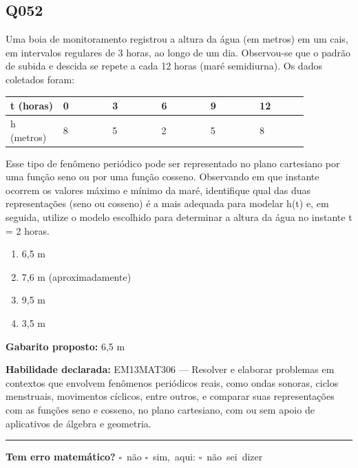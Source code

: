 \documentclass[11pt,a4paper]{article}
\begin{document}
\begin{samepage}
\subsection*{Q052}
Uma boia de monitoramento registrou a altura da água (em metros) em um cais, em intervalos regulares de 3 horas, ao longo de um dia. Observou-se que o padrão de subida e descida se repete a cada 12 horas (maré semidiurna). Os dados coletados foram:

\begin{center}
\begin{tabular}{|p{0.143\linewidth}|p{0.143\linewidth}|p{0.143\linewidth}|p{0.143\linewidth}|p{0.143\linewidth}|p{0.143\linewidth}|}
\hline
\textbf{t (horas)} & \textbf{0} & \textbf{3} & \textbf{6} & \textbf{9} & \textbf{12} \\
\hline
h (metros) & 8 & 5 & 2 & 5 & 8 \\
\hline
\end{tabular}
\end{center}

Esse tipo de fenômeno periódico pode ser representado no plano cartesiano por uma função seno ou por uma função cosseno. Observando em que instante ocorrem os valores máximo e mínimo da maré, identifique qual das duas representações (seno ou cosseno) é a mais adequada para modelar h(t) e, em seguida, utilize o modelo escolhido para determinar a altura da água no instante t = 2 horas.
\begin{enumerate}[label=(\alph*),nosep,leftmargin=*]
\item 6,5 m
\item 7,6 m (aproximadamente)
\item 9,5 m
\item 3,5 m
\end{enumerate}

\textbf{Gabarito proposto:} 6,5 m

\textbf{Habilidade declarada:} EM13MAT306 --- Resolver e elaborar problemas em contextos que envolvem fenômenos periódicos reais, como ondas sonoras, ciclos menstruais, movimentos cíclicos, entre outros, e comparar suas representações com as funções seno e cosseno, no plano cartesiano, com ou sem apoio de aplicativos de álgebra e geometria.
\end{samepage}

\noindent\rule{\linewidth}{0.4pt}
\textbf{Tem erro matemático?}\quad
\mbox{$\square$~não} \quad \mbox{$\square$~sim, aqui:} \underline{\hspace{5cm}}
\quad \mbox{$\square$~não sei dizer}
\end{document}
